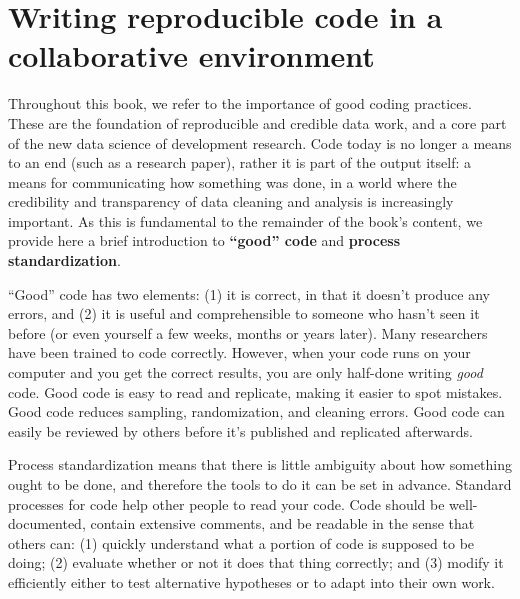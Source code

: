 \section{Writing reproducible code in a collaborative environment}
Throughout this book, we refer to the importance of good coding practices.
These are the foundation of reproducible and credible data work,
and a core part of the new data science of development research.
Code today is no longer a means to an end (such as a research paper),
rather it is part of the output itself: a means for communicating how something was done,
in a world where the credibility and transparency of data cleaning and analysis is increasingly important.
As this is fundamental to the remainder of the book's content,
we provide here a brief introduction to \textbf{``good'' code} and \textbf{process standardization}.

``Good'' code has two elements: (1) it is correct, in that it doesn't produce any errors,
and (2) it is useful and comprehensible to someone who hasn't seen it before
(or even yourself a few weeks, months or years later).
Many researchers have been trained to code correctly.
However, when your code runs on your computer and you get the correct results,
you are only half-done writing \textit{good} code.
Good code is easy to read and replicate, making it easier to spot mistakes.
Good code reduces sampling, randomization, and cleaning errors.
Good code can easily be reviewed by others before it's published and replicated afterwards.

Process standardization means that there is
little ambiguity about how something ought to be done,
and therefore the tools to do it can be set in advance.
Standard processes for code help other people to read your code.
Code should be well-documented, contain extensive comments, and be readable in the sense that others can:
(1) quickly understand what a portion of code is supposed to be doing;
(2) evaluate whether or not it does that thing correctly; and
(3) modify it efficiently either to test alternative hypotheses
or to adapt into their own work.


